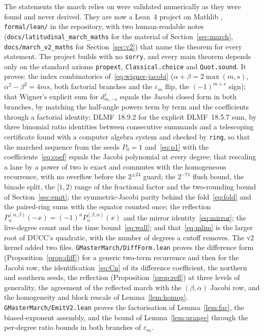 \documentclass[usenatbib,useAMS]{mnras}
\begin{document}
The statements the march relies on were validated numerically as they were found and never derived. They are now a Lean~4 project on Mathlib \citep{demoura2021,mathlib2020}, \texttt{formal/lean/} in the repository, with two human-readable notes (\texttt{docs/latitudinal\_march\_maths} for the material of Section~\ref{sec:march}, \texttt{docs/march\_v2\_maths} for Section~\ref{sec:v2}) that name the theorem for every statement. The project builds with no \texttt{sorry}, and every main theorem depends only on the standard axioms \texttt{propext}, \texttt{Classical.choice} and \texttt{Quot.sound}. It proves: the index combinatorics of~\eqref{eq:wigner-jacobi} ($\alpha+\beta=2\max(m,s)$, $\alpha^2-\beta^2=4ms$, both factorial branches and the $\varepsilon_m$ flip, the $(-1)^{m+s}$ sign); that Wigner's explicit sum for $d^j_{m,-s}$ equals the Jacobi closed form in both branches, by matching the half-angle powers term by term and the coefficients through a factorial identity; DLMF~18.9.2 for the explicit DLMF~18.5.7 sum, by three binomial ratio identities between consecutive summands and a telescoping certificate found with a computer algebra system and checked by \texttt{ring}, so that the marched sequence from the seeds $P_0=1$ and~\eqref{eq:p1} with the coefficients~\eqref{eq:coef} equals the Jacobi polynomial at every degree; that rescaling a lane by a power of two is exact and commutes with the homogeneous recurrence, with no overflow before the $2^{\pm24}$ guard; the $2^{-71}$ flush bound, the binade split, the $[1,2)$ range of the fractional factor and the two-rounding bound of Section~\ref{sec:emit}; the symmetric-Jacobi parity behind the fold~\eqref{eq:fold} and the paired-ring sums with the equator counted once; the reflection $P_n^{(\alpha,\beta)}(-x)=(-1)^nP_n^{(\beta,\alpha)}(x)$ and the mirror identity~\eqref{eq:mirror}; the live-degree count and the time bound~\eqref{eq:wall}; and that~\eqref{eq:mlim} is the larger root of DUCC's quadratic, with the number of degrees a cutoff removes. The v2 kernel added two files. \texttt{GMasterMarch/DiffForm.lean} proves the difference form (Proposition~\ref{prop:diff}) for a generic two-term recurrence and then for the Jacobi row, the identification~\eqref{eq:Cn} of its difference coefficient, the northern and southern seeds, the reflection (Proposition~\ref{prop:refl}) at three levels of generality, the agreement of the reflected march with the $(\beta,\alpha)$ Jacobi row, and the homogeneity and block rescale of Lemma~\ref{lem:homog}. \texttt{GMasterMarch/EmitV2.lean} proves the factorisation of Lemma~\ref{lem:fac}, the biased-exponent assembly, and the bound of Lemma~\ref{lem:urange} through the per-degree ratio bounds in both branches of $\varepsilon_m$.
\end{document}
